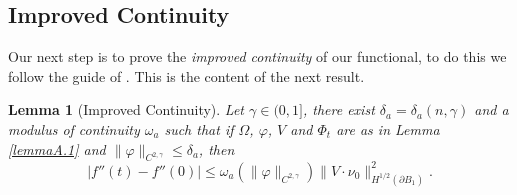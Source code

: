 \documentclass[oneside,a4paper,11pt,notitlepage]{article}
\theoremstyle{definition}
\theoremstyle{plain}
\newtheorem{lemma}[theorem]{Lemma}
\theoremstyle{definition}
\begin{document}
\subsection{Improved Continuity}
Our next step is to prove the \emph{improved continuity} of our functional, to do this we follow the guide of \cite[Lemma A.2]{BDPV}. This is the content of the next result.
\begin{lemma}[Improved Continuity]
    Let $\gamma\in(0,1]$, there exist $\delta_a=\delta_a(n,\gamma)$ and a modulus of continuity $\omega_a$ such that if $\Omega$, $\varphi$, $V$ and $\Phi_t$ are as in Lemma \ref{lemmaA.1} and $\|\varphi\|_{C^{2,\gamma}}\leq \delta_a$, then
    \begin{equation*}
        |f''(t)-f''(0)|\leq \omega_a(\|\varphi\|_{C^{2,\gamma}})\|V\cdot\nu_0\|_{H^{1/2}(\partial B_1)}^2.
    \end{equation*}
\end{lemma}
\end{document}
